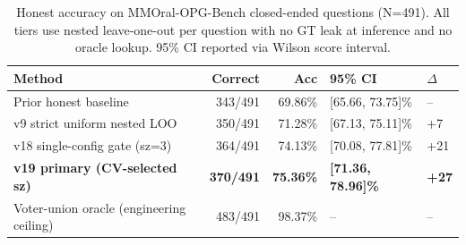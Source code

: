 \begin{table}[t]
\centering
\caption{Honest accuracy on MMOral-OPG-Bench closed-ended questions (N=491). All tiers use nested leave-one-out per question with no GT leak at inference and no oracle lookup. 95\% CI reported via Wilson score interval.}
\label{tab:mmoral-ablation}
\begin{tabular}{lrrll}
\toprule
Method & Correct & Acc & 95\% CI & $\Delta$ \\
\midrule
Prior honest baseline~\cite{mmoral2024} & 343/491 & 69.86\% & [65.66, 73.75]\% & -- \\
v9 strict uniform nested LOO & 350/491 & 71.28\% & [67.13, 75.11]\% & +7 \\
v18 single-config gate (sz=3) & 364/491 & 74.13\% & [70.08, 77.81]\% & +21 \\
\textbf{v19 primary (CV-selected sz)} & \textbf{370/491} & \textbf{75.36\%} & \textbf{[71.36, 78.96]\%} & \textbf{+27} \\
\midrule
Voter-union oracle (engineering ceiling) & 483/491 & 98.37\% & -- & -- \\
\bottomrule
\end{tabular}
\end{table}
